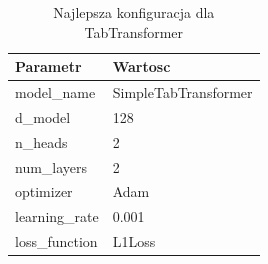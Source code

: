 \begin{table}[h]
\centering
\caption{Najlepsza konfiguracja dla TabTransformer}
\label{tab:best_config_tabtransformer}
\begin{tabular}{ll}
\toprule
Parametr & Wartosc \\
\midrule
model\_name & SimpleTabTransformer \\
d\_model & 128 \\
n\_heads & 2 \\
num\_layers & 2 \\
optimizer & Adam \\
learning\_rate & 0.001 \\
loss\_function & L1Loss \\
\bottomrule
\end{tabular}
\end{table}
